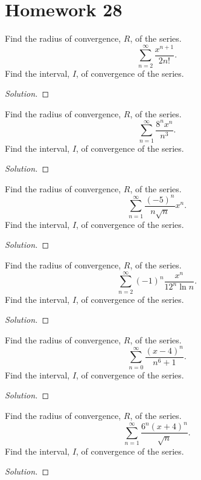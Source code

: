 \section*{Homework 28}
\begin{problem}[WebAssign HW 28, \# 1]
Find the radius of convergence, $R$, of the series.
\[
\sum_{n=2}^\infty\frac{x^{n+1}}{2n!}.
\]
Find the interval, $I$, of convergence of the series.
\end{problem}
\begin{proof}[Solution]
\end{proof}
\begin{problem}[WebAssign HW 28, \# 2]
Find the radius of convergence, $R$, of the series.
\[
\sum_{n=1}^\infty\frac{8^nx^n}{n^3}.
\]
Find the interval, $I$, of convergence of the series.
\end{problem}
\begin{proof}[Solution]
\end{proof}
\begin{problem}[WebAssign HW 28, \# 3]
Find the radius of convergence, $R$, of the series.
\[
\sum_{n=1}^\infty\frac{(-5)^n}{n\sqrt{n}}x^n.
\]
Find the interval, $I$, of convergence of the series.
\end{problem}
\begin{proof}[Solution]
\end{proof}
\begin{problem}[WebAssign HW 28, \# 4]
Find the radius of convergence, $R$, of the series.
\[
\sum_{n=2}^\infty(-1)^n\frac{x^n}{12^n\ln n}.
\]
Find the interval, $I$, of convergence of the series.
\end{problem}
\begin{proof}[Solution]
\end{proof}
\begin{problem}[WebAssign HW 28, \# 5]
Find the radius of convergence, $R$, of the series.
\[
\sum_{n=0}^\infty\frac{(x-4)^n}{n^6+1}.
\]
Find the interval, $I$, of convergence of the series.
\end{problem}
\begin{proof}[Solution]
\end{proof}
\begin{problem}[WebAssign HW 28, \# 6]
Find the radius of convergence, $R$, of the series.
\[
\sum_{n=1}^\infty\frac{6^n(x+4)^n}{\sqrt{n}}.
\]
Find the interval, $I$, of convergence of the series.
\end{problem}
\begin{proof}[Solution]
\end{proof}
